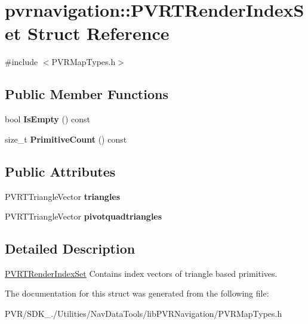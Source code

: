 \hypertarget{structpvrnavigation_1_1_p_v_r_t_render_index_set}{\section{pvrnavigation\+:\+:P\+V\+R\+T\+Render\+Index\+Set Struct Reference}
\label{structpvrnavigation_1_1_p_v_r_t_render_index_set}
}


{\ttfamily \#include $<$P\+V\+R\+Map\+Types.\+h$>$}

\subsection*{Public Member Functions}
\begin{DoxyCompactItemize}
\item 
\hypertarget{structpvrnavigation_1_1_p_v_r_t_render_index_set_a7ab530da67baaa06536bac3e37338d19}{bool {\bfseries Is\+Empty} () const }\label{structpvrnavigation_1_1_p_v_r_t_render_index_set_a7ab530da67baaa06536bac3e37338d19}

\item 
\hypertarget{structpvrnavigation_1_1_p_v_r_t_render_index_set_a595ea2a425b754b6d2ef37456c32caf6}{size\+\_\+t {\bfseries Primitive\+Count} () const }\label{structpvrnavigation_1_1_p_v_r_t_render_index_set_a595ea2a425b754b6d2ef37456c32caf6}

\end{DoxyCompactItemize}
\subsection*{Public Attributes}
\begin{DoxyCompactItemize}
\item 
\hypertarget{structpvrnavigation_1_1_p_v_r_t_render_index_set_a01ab903100e4ab66654f28fdbfbbe88e}{P\+V\+R\+T\+Triangle\+Vector {\bfseries triangles}}\label{structpvrnavigation_1_1_p_v_r_t_render_index_set_a01ab903100e4ab66654f28fdbfbbe88e}

\item 
\hypertarget{structpvrnavigation_1_1_p_v_r_t_render_index_set_ab50c020a0b2275dc94cf82e0ee501820}{P\+V\+R\+T\+Triangle\+Vector {\bfseries pivotquadtriangles}}\label{structpvrnavigation_1_1_p_v_r_t_render_index_set_ab50c020a0b2275dc94cf82e0ee501820}

\end{DoxyCompactItemize}


\subsection{Detailed Description}


  \hyperlink{structpvrnavigation_1_1_p_v_r_t_render_index_set}{P\+V\+R\+T\+Render\+Index\+Set}  Contains index vectors of triangle based primitives. 

The documentation for this struct was generated from the following file\+:\begin{DoxyCompactItemize}
\item 
P\+V\+R/\+S\+D\+K\+\_./\+Utilities/\+Nav\+Data\+Tools/lib\+P\+V\+R\+Navigation/P\+V\+R\+Map\+Types.\+h\end{DoxyCompactItemize}
